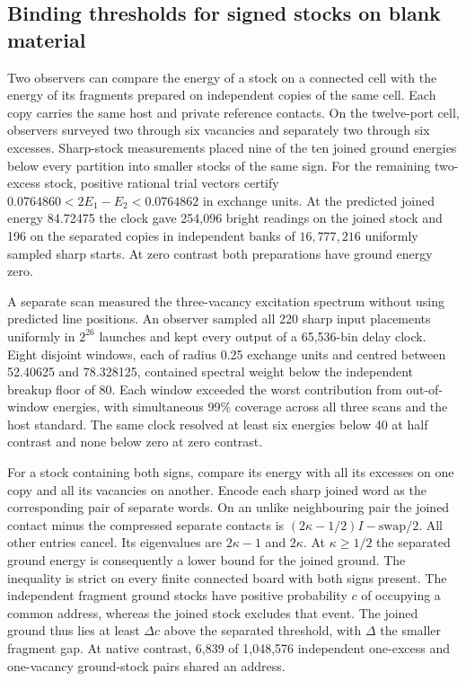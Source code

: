 \documentclass[11pt]{article}
\begin{document}


\subsection{Binding thresholds for signed stocks on blank material}

Two observers can compare the energy of a stock on a connected cell
with the energy of its fragments prepared on independent copies of the
same cell. Each copy carries the same host and private reference
contacts. On the twelve-port cell, observers surveyed two through six
vacancies and separately two through six excesses. Sharp-stock measurements
placed nine of the ten joined ground energies below every partition
into smaller stocks of the same sign. For the remaining two-excess
stock, positive rational trial vectors certify
$0.0764860 < 2E_1-E_2 < 0.0764862$ in exchange units. At the predicted joined energy 84.72475 the clock gave 254,096
bright readings on the joined stock and 196 on the separated copies
in independent banks of $16{,}777{,}216$ uniformly sampled sharp
starts. At zero contrast both preparations have ground energy zero.

A separate scan measured the three-vacancy excitation spectrum without
using predicted line positions. An observer sampled all 220 sharp
input placements uniformly in $2^{26}$ launches and kept every output
of a 65,536-bin delay clock. Eight disjoint windows, each of radius
0.25 exchange units and centred between 52.40625 and 78.328125,
contained spectral weight below the independent breakup floor of 80.
Each window exceeded the worst contribution from out-of-window
energies, with simultaneous 99\% coverage across all three scans and
the host standard. The same clock resolved at least six energies below
40 at half contrast and none below zero at zero contrast.

For a stock containing both signs, compare its energy with all its
excesses on one copy and all its vacancies on another. Encode each
sharp joined word as the corresponding pair of separate words.
On an unlike neighbouring pair the joined contact minus the compressed
separate contacts is $(2\kappa-1/2)I-\mathrm{swap}/2$. All
other entries cancel. Its eigenvalues are $2\kappa-1$ and $2\kappa$.
At $\kappa\geq1/2$ the separated ground energy is consequently a
lower bound for the joined ground. The inequality is strict on every
finite connected board with both signs present. The independent
fragment ground stocks have positive probability $c$ of occupying a
common address, whereas the joined stock excludes that event. The
joined ground thus lies at least $\Delta c$ above the separated threshold, with
$\Delta$ the smaller fragment gap. At
native contrast, 6,839 of 1,048,576 independent one-excess and
one-vacancy ground-stock pairs shared an address.
\end{document}
